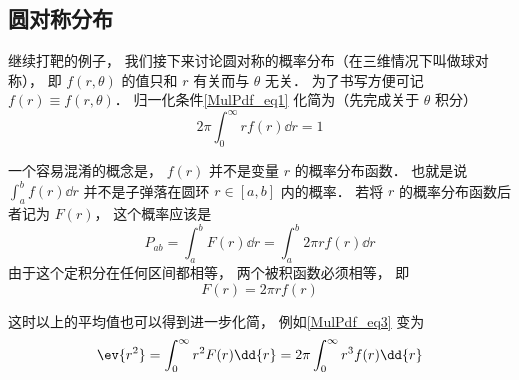 
\subsection{圆对称分布}
继续打靶的例子， 我们接下来讨论圆对称的概率分布（在三维情况下叫做球对称）， 即 $f(r, \theta)$ 的值只和 $r$ 有关而与 $\theta$ 无关． 为了书写方便可记 $f(r) \equiv f(r, \theta)$． 归一化条件\autoref{MulPdf_eq1} 化简为（先完成关于 $\theta$ 积分）
\begin{equation}
2\pi \int_0^\infty r f(r) \dd{r} = 1
\end{equation}

一个容易混淆的概念是， $f(r)$ 并不是变量 $r$ 的概率分布函数． 也就是说 $\int_a^b f(r) \dd{r}$ 并不是子弹落在圆环 $r \in [a, b]$ 内的概率． 若将 $r$ 的概率分布函数后者记为 $F(r)$， 这个概率应该是
\begin{equation}\label{MulPdf_eq4}
P_{ab} = \int_a^b F(r) \dd{r} = \int_a^b 2\pi r f(r) \dd{r}
\end{equation}
由于这个定积分在任何区间都相等， 两个被积函数必须相等， 即
\begin{equation}\label{MulPdf_eq5}
F(r) = 2\pi r f(r)
\end{equation}

这时以上的平均值也可以得到进一步化简， 例如\autoref{MulPdf_eq3} 变为
\begin{equation}
\ev{r^2} = \int_0^\infty r^2 F(r) \dd{r}
= 2\pi \int_0^\infty r^3 f(r) \dd{r}
\end{equation}
